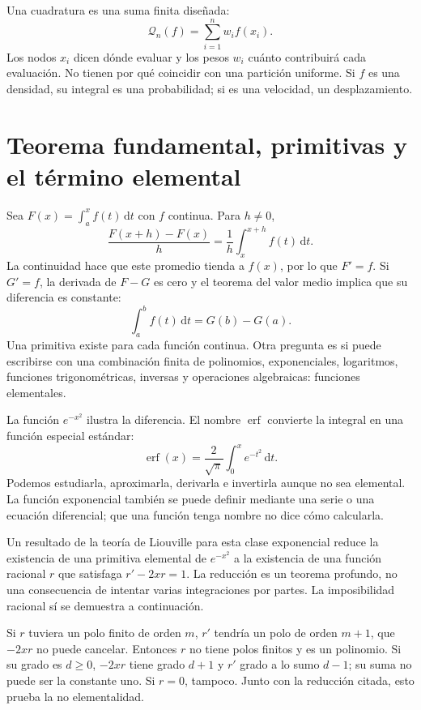 \documentclass[11pt,a4paper]{article}
\newcommand{\dd}{\,\mathrm d}
\theoremstyle{definition}
\DeclareMathOperator{\erf}{erf}
\begin{document}
Una cuadratura es una suma finita diseñada:
\[
\mathcal Q_n(f)=\sum_{i=1}^n w_i f(x_i).
\]
Los nodos $x_i$ dicen dónde evaluar y los pesos $w_i$ cuánto contribuirá cada evaluación. No tienen por qué coincidir con una partición uniforme. Si $f$ es una densidad, su integral es una probabilidad; si es una velocidad, un desplazamiento.

\section{Teorema fundamental, primitivas y el término elemental}
Sea $F(x)=\int_a^x f(t)\dd t$ con $f$ continua. Para $h\ne0$,
\[
\frac{F(x+h)-F(x)}h=\frac1h\int_x^{x+h}f(t)\dd t.
\]
La continuidad hace que este promedio tienda a $f(x)$, por lo que $F'=f$. Si $G'=f$, la derivada de $F-G$ es cero y el teorema del valor medio implica que su diferencia es constante:
\[
\int_a^b f(t)\dd t=G(b)-G(a).
\]
Una primitiva existe para cada función continua. Otra pregunta es si puede escribirse con una combinación finita de polinomios, exponenciales, logaritmos, funciones trigonométricas, inversas y operaciones algebraicas: funciones elementales.

La función $e^{-x^2}$ ilustra la diferencia. El nombre $\erf$ convierte la integral en una función especial estándar:
\[
\erf(x)=\frac2{\sqrt\pi}\int_0^x e^{-t^2}\dd t.
\]
Podemos estudiarla, aproximarla, derivarla e invertirla aunque no sea elemental. La función exponencial también se puede definir mediante una serie o una ecuación diferencial; que una función tenga nombre no dice cómo calcularla.

\begin{cuidado}
Un resultado de la teoría de Liouville para esta clase exponencial reduce la existencia de una primitiva elemental de $e^{-x^2}$ a la existencia de una función racional $r$ que satisfaga $r'-2xr=1$. La reducción es un teorema profundo, no una consecuencia de intentar varias integraciones por partes. La imposibilidad racional sí se demuestra a continuación.
\end{cuidado}
Si $r$ tuviera un polo finito de orden $m$, $r'$ tendría un polo de orden $m+1$, que $-2xr$ no puede cancelar. Entonces $r$ no tiene polos finitos y es un polinomio. Si su grado es $d\ge0$, $-2xr$ tiene grado $d+1$ y $r'$ grado a lo sumo $d-1$; su suma no puede ser la constante uno. Si $r=0$, tampoco. Junto con la reducción citada, esto prueba la no elementalidad.
\end{document}
